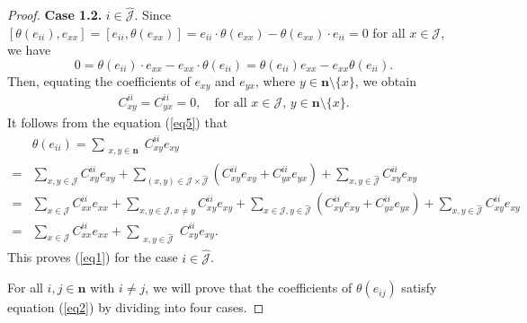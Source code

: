 \documentclass[10pt,a4paper]{amsart}
\begin{document}
\begin{proof}
\textbf{Case 1.2.} $ i \in \hat{\mathcal{J}} $. Since $ [\theta(e_{ii}), e_{xx}] = [e_{ii}, \theta(e_{xx})] = e_{ii} \cdot  \theta(e_{xx}) - \theta(e_{xx}) \cdot  e_{ii} = 0 $ for all $ x \in \mathcal{J} $, we have 
\[
0 = \theta(e_{ii}) \cdot  e_{xx} - e_{xx} \cdot  \theta(e_{ii}) = \theta(e_{ii}) e_{xx} - e_{xx} \theta(e_{ii}).
\]
Then, equating the coefficients of $ e_{xy} $ and $ e_{yx} $, where $ y \in \mathbf{n} \setminus \{x\} $, we obtain 
 \begin{align}\label{eq5}
 C_{xy}^{ii} = C_{yx}^{ii} = 0, \quad \text{for all } x \in \mathcal{J},\, y \in \mathbf{n} \setminus \{x\}.
 \end{align}
It follows from the equation (\ref{eq5}) that
\[
\begin{aligned}
&\theta(e_{ii}) = \sum_{\substack{x,y \in \mathbf{n}}} C_{xy}^{ii} e_{xy} \\
=&\sum_{x,y \in \mathcal{J}} C_{xy}^{ii} e_{xy}
 +\sum_{(x,y) \in \mathcal{J} \times \hat{\mathcal{J}}} (C_{xy}^{ii} e_{xy}+C_{yx}^{ii} e_{yx})+\sum_{x,y \in \hat{\mathcal{J}}} C_{xy}^{ii} e_{xy}\\
=& \sum_{x \in \mathcal{J}} C_{xx}^{ii} e_{xx} + \sum_{x,y \in \mathcal{J}, x\neq y} C_{xy}^{ii} e_{xy}+
\sum_{x \in \mathcal{J}, y\in \hat{\mathcal{J}}} (C_{xy}^{ii} e_{xy}+C_{yx}^{ii} e_{yx})+\sum_{x,y \in \hat{\mathcal{J}}} C_{xy}^{ii} e_{xy}\\
=& \sum_{x \in \mathcal{J}} C_{xx}^{ii} e_{xx} + \sum_{\substack{x , y \in \hat{\mathcal{J}}}} C_{xy}^{ii} e_{xy}.
\end{aligned}
\]
This proves (\ref{eq1}) for the case $ i \in \hat{\mathcal{J}} $.


For all $ i,j \in \mathbf{n} $ with $ i \neq j $, we will prove that the coefficients of $\theta(e_{ij})$ satisfy equation (\ref{eq2}) by dividing into four cases.


\end{proof}
\end{document}

